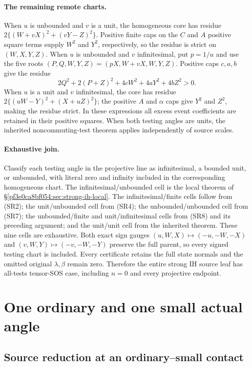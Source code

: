 \paragraph{The remaining remote charts.}
When $u$ is unbounded and $v$ is a unit, the homogeneous core has
residue $2\{(W+vX)^2+(vY-Z)^2\}$. Positive finite caps on the $C$
and $A$ positive square terms supply $W^2$ and $Y^2$, respectively, so the residue
is strict on $(W,X,Y,Z)$. When $u$ is unbounded and $v$ infinitesimal,
put $p=1/u$ and use the five roots
$(P,Q,W,Y,Z)=(pX,W+vX,W,Y,Z)$. Positive caps $c,a,b$ give the residue
\[
 2Q^2+2(P+Z)^2+4cW^2+4aY^2+4bZ^2>0.
\tag{SR8}
\]
When $u$ is a unit and $v$ infinitesimal, the core has residue
$2\{(uW-Y)^2+(X+uZ)^2\}$; the positive $A$ and $\alpha$ caps give
$Y^2$ and $Z^2$, making the residue strict. In these expressions all
excess event coefficients are retained in their positive squares.
When both testing angles are units, the inherited noncommuting-test
theorem applies independently of source scales.

\paragraph{Exhaustive join.}
Classify each testing angle in the projective line as infinitesimal,
a bounded unit, or unbounded, with literal zero and infinity included
in the corresponding homogeneous chart. The infinitesimal/unbounded
cell is the local theorem of \S\ref{pf3e0ca8bf054:sec:strong-ih-local}.
The infinitesimal/finite cells follow from (SR2); the unit/unbounded
cell from (SR4); the unbounded/unbounded cell from (SR7); the
unbounded/finite and unit/infinitesimal cells from (SR8) and its
preceding argument; and the unit/unit cell from the inherited theorem.
These nine cells are exhaustive. Both exact sign gauges
$(u,W,X)\mapsto(-u,-W,-X)$ and
$(v,W,Y)\mapsto(-v,-W,-Y)$ preserve the full parent, so every
signed testing chart is included. Every certificate retains the full
state normals and the omitted original $\lambda,\beta$ remain zero.
Therefore the entire strong IH source leaf has all-tests tensor-SOS
case, including $n=0$ and every projective endpoint.

\section{One ordinary and one small actual angle}
\subsection{Source reduction at an ordinary--small contact}
\label{component:pc3daa35e9a9b}

